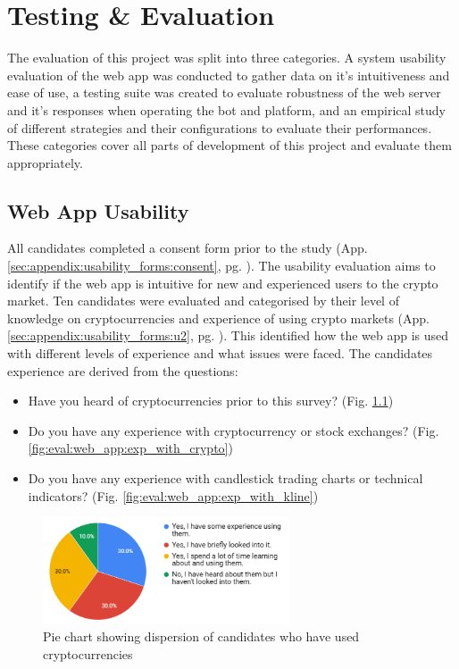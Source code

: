%
\chapter{Testing \& Evaluation}
\label{sec:evaluation}

The evaluation of this project was split into three categories. A system usability evaluation of the web app was conducted to gather data on it's intuitiveness and ease of use, a testing suite was created to evaluate robustness of the web server and it's responses when operating the bot and platform, and an empirical study of different strategies and their configurations to evaluate their performances. These categories cover all parts of development of this project and evaluate them appropriately.


\section{Web App Usability}
\label{sec:evaluation:ui}
\noindent All candidates completed a consent form prior to the study (App. \ref{sec:appendix:usability_forms:consent}, pg. \pageref{sec:appendix:usability_forms:consent}). The usability evaluation aims to identify if the web app is intuitive for new and experienced users to the crypto market. Ten candidates were evaluated and categorised by their level of knowledge on cryptocurrencies and experience of using crypto markets (App. \ref{sec:appendix:usability_forms:u2}, pg. \pageref{sec:appendix:usability_forms:u2}). This identified how the web app is used with different levels of experience and what issues were faced. The candidates experience are derived from the questions:
\begin{itemize}
	\item Have you heard of cryptocurrencies prior to this survey? (Fig. \ref{fig:eval:web_app:heard_of_crypto})
    \item Do you have any experience with cryptocurrency or stock exchanges? (Fig. \ref{fig:eval:web_app:exp_with_crypto})
    \item Do you have any experience with candlestick trading charts or technical indicators? (Fig. \ref{fig:eval:web_app:exp_with_kline})
\end{itemize}


  \begin{figure}[ht]
  \centering
 \includegraphics[width=0.65\textwidth]{content/graphics/heard_of_crypto.PNG}
  \caption{Pie chart showing dispersion of candidates who have used cryptocurrencies}
  \label{fig:eval:web_app:heard_of_crypto}
\end{figure}

